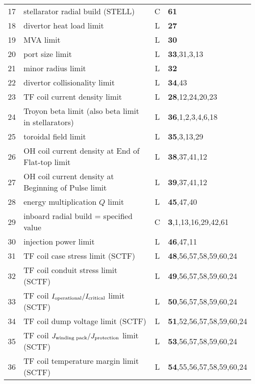 \begin{table}[tbph]
\begin{center}
\begin{tabular}{||c|l|c|l||}
17  & stellarator radial build (STELL)                    & C    & {\bf 61} \\
18  & divertor heat load limit                            & L    & {\bf 27} \\
19  & MVA limit                                           & L    & {\bf 30} \\
20  & port size limit                                     & L    & {\bf 33},31,3,13 \\
21  & minor radius limit                                  & L    & {\bf 32} \\
22  & divertor collisionality limit                       & L    & {\bf 34},43 \\
23  & TF coil current density limit                       & L    & {\bf 28},12,24,20,23 \\
24  & Troyon beta limit (also beta limit in stellarators) & L    & {\bf 36},1,2,3,4,6,18 \\
25  & toroidal field limit                                & L    & {\bf 35},3,13,29 \\
26  & OH coil current density at End of Flat-top limit    & L    & {\bf 38},37,41,12 \\
27  & OH coil current density at Beginning of Pulse limit & L    & {\bf 39},37,41,12 \\
28  & energy multiplication $Q$ limit                     & L    & {\bf 45},47,40 \\
29  & inboard radial build = specified value              & C    & {\bf 3},1,13,16,29,42,61 \\
30  & injection power limit                               & L    & {\bf 46},47,11 \\
31  & TF coil case stress limit (SCTF)                    & L    & {\bf 48},56,57,58,59,60,24 \\
32  & TF coil conduit stress limit (SCTF)                 & L    & {\bf 49},56,57,58,59,60,24 \\
33  & TF coil $I_{\mbox{\scriptsize operational}}/
I_{\mbox{\scriptsize critical}}$ limit (SCTF)             & L    & {\bf 50},56,57,58,59,60,24 \\
34  & TF coil dump voltage limit (SCTF)                   & L    & {\bf 51},52,56,57,58,59,60,24 \\
35  & TF coil $J_{\mbox{\scriptsize winding pack}}/
J_{\mbox{\scriptsize protection}}$ limit (SCTF)           & L    & {\bf 53},56,57,58,59,60,24 \\
36  & TF coil temperature margin limit (SCTF)             & L    & {\bf 54},55,56,57,58,59,60,24 \\

\end{tabular}
\end{center}
\end{table}
